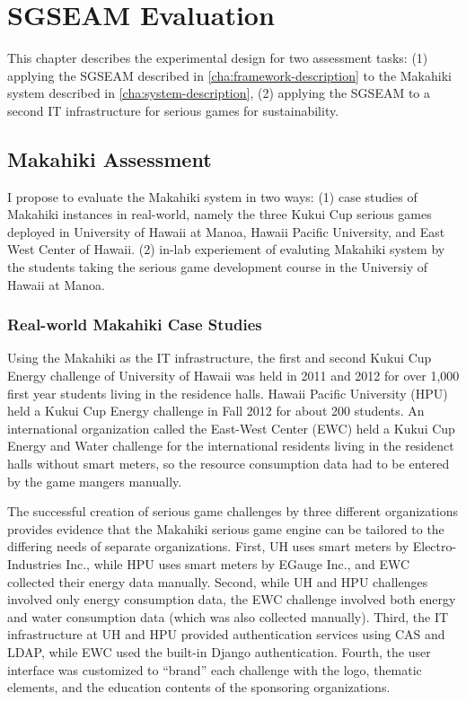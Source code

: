 \chapter{SGSEAM Evaluation}
\label{cha:ExperimentalDesign}
This chapter describes the experimental design for two assessment tasks: (1) applying the SGSEAM described in \autoref{cha:framework-description} to the Makahiki system described in \autoref{cha:system-description}, (2) applying the SGSEAM to a second IT infrastructure for serious games for sustainability.

\section{Makahiki Assessment}
I propose to evaluate the Makahiki system in two ways: (1) case studies of Makahiki instances in real-world, namely the three Kukui Cup serious games deployed in University of Hawaii at Manoa, Hawaii Pacific University, and East West Center of Hawaii. (2) in-lab experiement of evaluting Makahiki system by the students taking the serious game development course in the Universiy of Hawaii at Manoa.

\subsection{Real-world Makahiki Case Studies}

Using the Makahiki as the IT infrastructure, the first and second Kukui Cup Energy challenge of University of Hawaii was held in 2011 and 2012 for over 1,000 first year students living in the residence halls. Hawaii Pacific University (HPU) held a Kukui Cup Energy challenge in Fall 2012 for about 200 students. An international organization called the East-West Center (EWC) held a Kukui Cup Energy and Water challenge for the international residents living in the residenct halls without smart meters, so the resource consumption data had to be entered by the game mangers manually.

The successful creation of serious game challenges by three different organizations provides evidence that the Makahiki serious game engine can be tailored to the differing needs of separate organizations. First, UH uses smart meters by Electro-Industries Inc., while HPU uses smart meters by EGauge Inc., and EWC collected their energy data manually. Second, while UH and HPU challenges involved only energy consumption data, the EWC challenge involved both energy and water consumption data (which was also collected manually).  Third, the IT infrastructure at UH and HPU provided authentication services using CAS and LDAP, while EWC used the built-in Django authentication. Fourth, the user interface was customized to ``brand'' each challenge with the logo, thematic elements, and the education contents of the sponsoring organizations.

